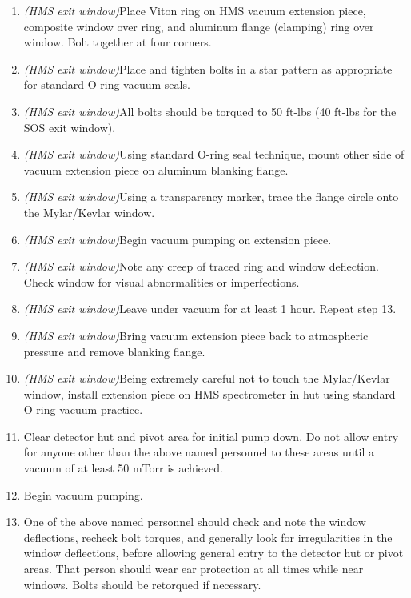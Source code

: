 {\begin{enumerate}
\item{{\sl (HMS exit window)}Place Viton ring on HMS vacuum extension piece, composite
window over ring, and aluminum flange (clamping) ring over window.   Bolt together at four corners.}

\item{{\sl (HMS exit window)}Place and tighten bolts in a star pattern as appropriate for
standard O-ring vacuum seals.}

\item{{\sl (HMS exit window)}All bolts should be torqued to 50 ft-lbs (40 ft-lbs for the SOS
exit window).}

\item{{\sl (HMS exit window)}Using standard O-ring seal technique, mount other side of
vacuum extension piece on aluminum blanking flange.}

\item{{\sl (HMS exit window)}Using a transparency marker, trace the flange circle onto the
Mylar/Kevlar window.}

\item{{\sl (HMS exit window)}Begin vacuum pumping on extension
piece.} 

\item{{\sl (HMS exit window)}Note any creep of traced ring and window
deflection.  Check window for visual abnormalities or imperfections.}

\item{{\sl (HMS exit window)}Leave under vacuum for at least 1 hour.
Repeat step 13.}

\item{{\sl (HMS exit window)}Bring vacuum extension piece back to
atmospheric pressure and remove blanking flange.}

\item{{\sl (HMS exit window)}Being extremely careful not to touch the
Mylar/Kevlar window, install extension piece on HMS spectrometer in
hut using standard O-ring vacuum practice.}

\item{Clear detector hut and pivot area for initial pump down. Do not
allow entry for anyone other than the above named personnel to
these areas until a vacuum of at least 50 mTorr is achieved.}

\item{Begin vacuum pumping.}

\item{One of the above named personnel should check and note the
window deflections, recheck bolt torques, and generally look for
irregularities in the window deflections, before allowing
general entry to the detector
hut or pivot areas. That person should wear ear protection at all times while
near windows. Bolts should be retorqued if necessary.}


\end{enumerate}}
